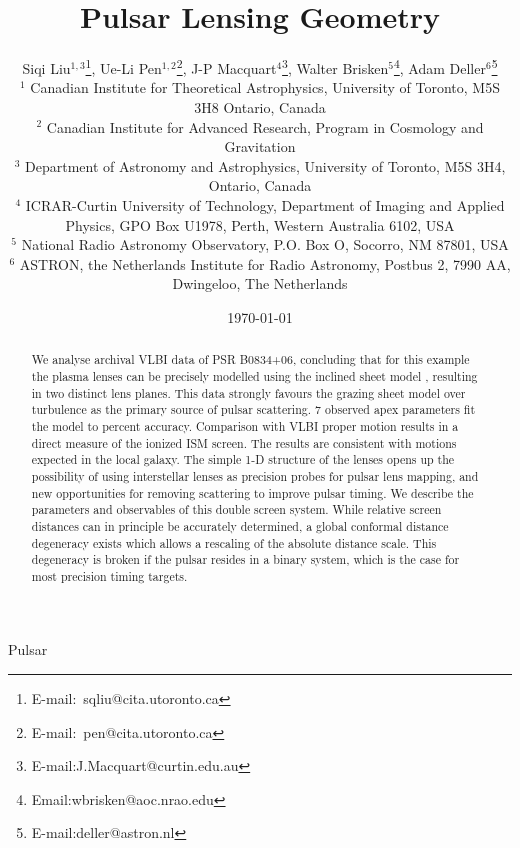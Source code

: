 \documentclass[useAMS,usenatbib]{mn2e}
\begin{document}
\title[Lensing Geometry]{
Pulsar Lensing Geometry
}

\author[Liu et al]{Siqi Liu$^{1,3}$\thanks{E-mail:\ sqliu@cita.utoronto.ca}, Ue-Li
  Pen$^{1,2}$\thanks{E-mail:\ pen@cita.utoronto.ca}, J-P Macquart$^{4}$\thanks{E-mail:J.Macquart@curtin.edu.au},
  Walter Brisken$^{5}$\thanks{Email:wbrisken@aoc.nrao.edu}, Adam Deller$^{6}$\thanks{E-mail:deller@astron.nl}\\
 $^1$ Canadian Institute for Theoretical Astrophysics, University of Toronto, M5S 3H8 Ontario, Canada \\
$^2$ Canadian Institute for Advanced Research, Program in Cosmology
and Gravitation\\
$^3$ Department of Astronomy and Astrophysics, University of Toronto, M5S 3H4, Ontario, Canada\\
$^4$ ICRAR-Curtin University of Technology, Department of Imaging and Applied Physics, GPO Box U1978, Perth, Western Australia 6102, USA \\
$^5$ National Radio Astronomy Observatory, P.O. Box O, Socorro, NM 87801, USA\\
$^6$ ASTRON, the Netherlands Institute for Radio Astronomy, Postbus 2, 7990 AA, Dwingeloo, The Netherlands\\
}

\date{\today}

\pagerange{\pageref{firstpage}--\pageref{lastpage}} 

\maketitle
\label{firstpage}
\begin{abstract}
We analyse archival VLBI data of PSR
B0834+06, concluding that for this example the plasma lenses can be
precisely modelled using the inclined sheet model \citep{2014MNRAS.442.3338P},
resulting in two distinct lens planes.  This data strongly favours the
grazing sheet model over turbulence as the primary source of
pulsar scattering.  7 observed apex parameters fit the model to
percent accuracy. Comparison with VLBI proper motion results in a
direct measure of the ionized ISM screen.  The results are consistent
with motions expected in the local galaxy.
The simple 1-D structure of the lenses opens up
the possibility of using interstellar lenses as precision probes for
pulsar lens mapping, and new opportunities for removing scattering to
improve pulsar timing.
We describe the parameters and observables of this double screen
system.  While relative screen distances can in principle be
accurately determined,
a global conformal distance degeneracy exists which allows a rescaling
of the absolute distance scale.  This degeneracy is broken if the
pulsar resides in a binary system, which is the case for most
precision timing targets.

\end{abstract}
\begin{keywords}
Pulsar
\end{keywords}
\end{document}
